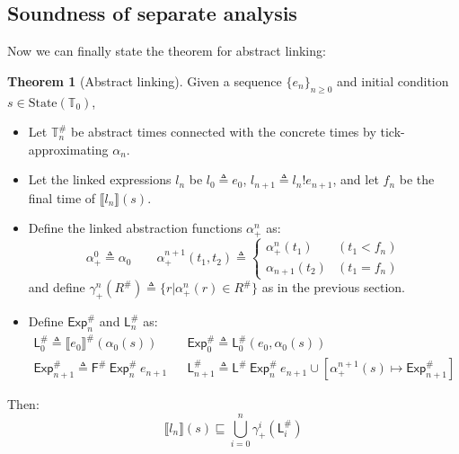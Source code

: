 \documentclass[acmsmall,review]{acmart}\settopmatter{printfolios=true,printccs=false,printacmref=false}
\theoremstyle{definition}
\newtheorem{thm}{Theorem}[section]
\newcommand*{\A}[1]{{#1}^{\#}}
\newcommand*{\Time}{\mathbb{T}}
\newcommand*{\ATime}{\A{\Time}}
\newcommand*{\State}[1]{\text{State}({#1})}
\newcommand*{\link}[2]{{#1}\mathtt{!}{#2}}
\newcommand*{\EE}{\mathsf{Exp}}
\newcommand*{\LL}{\mathsf{L}}
\newcommand*{\sembracket}[1]{\lBrack{#1}\rBrack}
\begin{document}
\subsection{Soundness of separate analysis}
Now we can finally state the theorem for abstract linking:
\begin{thm}[Abstract linking]
  Given a sequence $\{e_n\}_{n\ge 0}$ and initial condition $s\in\State{\Time_0}$,

  \begin{itemize}
    \item Let $\ATime_n$ be abstract times connected with the concrete times by tick-approximating $\alpha_n$.
    \item Let the linked expressions $l_n$ be $l_0\triangleq e_0$, $l_{n+1}\triangleq\link{l_n}{e_{n+1}}$, and let $f_n$ be the final time of $\sembracket{l_n}(s)$.
    \item Define the linked abstraction functions $\alpha^{n}_+$ as:
          \[
            \alpha^0_+\triangleq\alpha_0
            \qquad
            \alpha^{n+1}_+(t_1,t_2)\triangleq
            \begin{cases}
              \alpha^n_+(t_1)   & (t_1<f_n) \\
              \alpha_{n+1}(t_2) & (t_1=f_n)
            \end{cases}
          \]
          and define $\gamma^{n}_+(\A{R})\triangleq\{r|\alpha^{n}_+(r)\in\A{R}\}$ as in the previous section.
    \item Define $\A\EE_n$ and $\A\LL_n$ as:
          \begin{align*}
            \A\LL_0\triangleq\A{\sembracket{e_0}}(\alpha_0(s))    &  & \A\EE_0\triangleq\A\LL_0(e_0,\alpha_0(s))                                             \\
            \A\EE_{n+1}\triangleq\A{\mathsf{F}}\:\A\EE_n\:e_{n+1} &  & \A\LL_{n+1}\triangleq\A\LL\:\A\EE_n\:e_{n+1}\cup[\alpha^{n+1}_+(s)\mapsto\A\EE_{n+1}]
          \end{align*}
  \end{itemize}

  Then:
  \[
    \sembracket{l_n}(s)\sqsubseteq\bigcup_{i=0}^{n}{\gamma^i_+(\A\LL_i)}
  \]
\end{thm}


\end{document}
